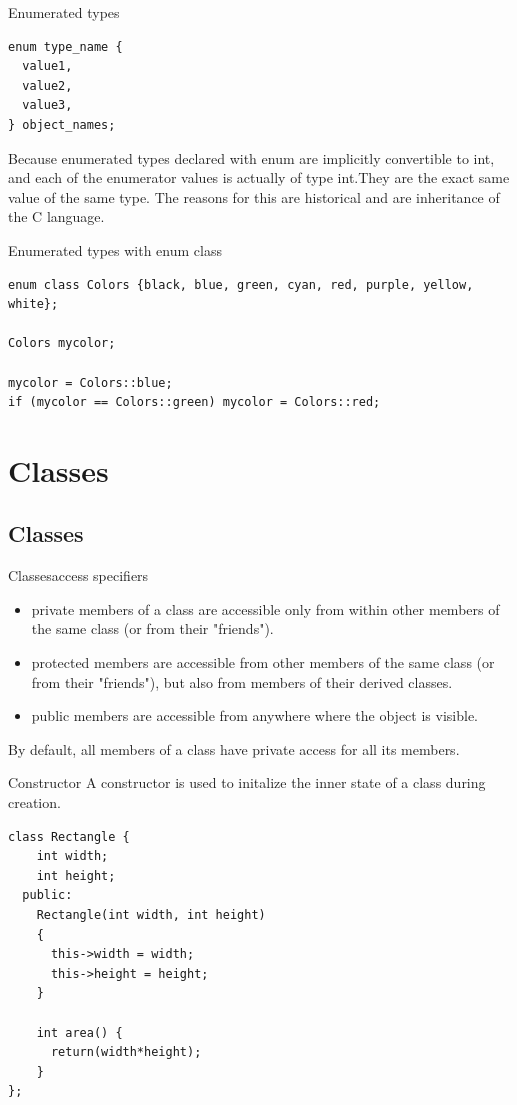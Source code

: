 \documentclass{beamer}
\begin{document}
\begin{frame}[fragile]{Enumerated types}
\begin{lstlisting}
enum type_name {
  value1,
  value2,
  value3,
} object_names;
\end{lstlisting}

Because enumerated types declared with enum are implicitly convertible to int,
and each of the enumerator values is actually of type int.They are the exact
same value of the same type. The reasons for this are historical and are
inheritance of the C language.
\end{frame}

\begin{frame}[fragile]{Enumerated types with enum class}
\begin{lstlisting}
enum class Colors {black, blue, green, cyan, red, purple, yellow, white};

Colors mycolor;

mycolor = Colors::blue;
if (mycolor == Colors::green) mycolor = Colors::red; 
\end{lstlisting}
\end{frame}


\section{Classes}
\subsection{Classes}
\begin{frame}{Classes}{access specifiers}
\begin{itemize}
  \item private members of a class are accessible only from within other members
        of the same class (or from their "friends").
  \item protected members are accessible from other members of the same class
        (or from their "friends"), but also from members of their derived
        classes.
  \item public members are accessible from anywhere where the object is
        visible.
\end{itemize}

By default, all members of a class have private access for all its members.
\end{frame}

\begin{frame}[fragile]{Constructor}
A constructor is used to initalize the inner state of a class during creation.
\begin{lstlisting}
class Rectangle {
    int width;
    int height;
  public:
    Rectangle(int width, int height)
    {
      this->width = width;
      this->height = height;
    }

    int area() {
      return(width*height);
    }
};
\end{lstlisting}
\end{frame}
\end{document}
